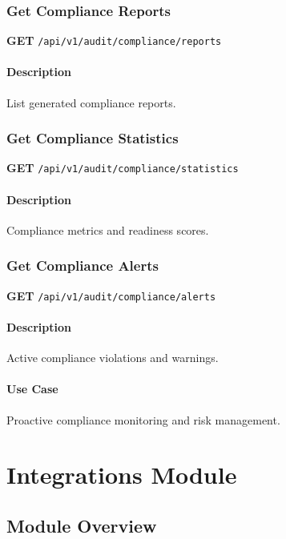 \documentclass[11pt,a4paper]{report}
\begin{document}
\subsection{Get Compliance Reports}

\textbf{GET} \texttt{/api/v1/audit/compliance/reports}

\subsubsection{Description}
List generated compliance reports.

\subsection{Get Compliance Statistics}

\textbf{GET} \texttt{/api/v1/audit/compliance/statistics}

\subsubsection{Description}
Compliance metrics and readiness scores.

\subsection{Get Compliance Alerts}

\textbf{GET} \texttt{/api/v1/audit/compliance/alerts}

\subsubsection{Description}
Active compliance violations and warnings.

\subsubsection{Use Case}
Proactive compliance monitoring and risk management.

\newpage

\chapter{Integrations Module}

\section{Module Overview}
\end{document}
